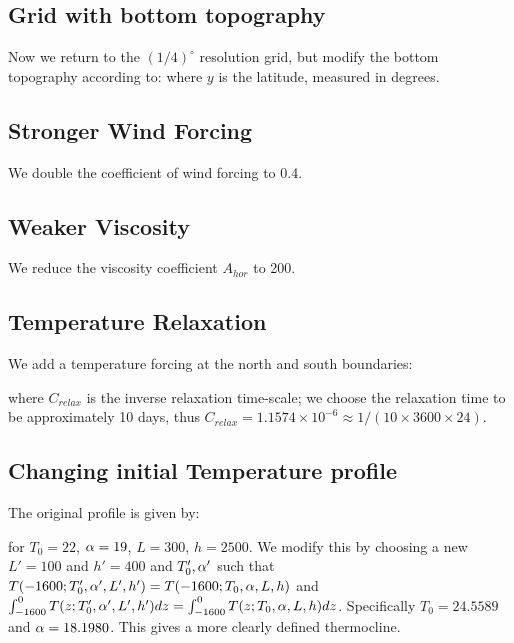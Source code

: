 \documentclass[10pt]{article}
\begin{document}
\iffalse
\allplot{high}{res}{1}{1948}{12}{1956}{0}{10}{22}
\fi
\subsection{Grid with bottom topography}

Now we return to the $(1/4)^\circ$ resolution grid, but modify the bottom topography according to:
where $y$ is the latitude, measured in degrees. 

\iffalse
\allplot{bottom}{topog}{1}{1948}{12}{1956}{0}{10}{22}
\fi

\subsection{Stronger Wind Forcing}

We double the coefficient of wind forcing to 0.4.

\subsection{Weaker Viscosity}

We reduce the viscosity coefficient $A_{hor}$ to 200.

\subsection{Temperature Relaxation}

We add a temperature forcing at the north and south boundaries:


where $C_{relax}$ is the inverse relaxation time-scale; we choose the relaxation time to be approximately 10 days, thus $C_{relax} = 1.1574\times 10^{-6} \approx 1/(10\times 3600\times 24)$.  

\subsection{Changing initial Temperature profile}

The original profile is given by:

for $T_{0} = 22$, $\alpha = 19$, $L = 300$, $h = 2500$. We modify this by choosing a new $L' = 100$ and $h' = 400$ and $T_{0}',\alpha'$ such that $T(-1600; T_{0}',\alpha',L',h') = T(-1600; T_{0},\alpha,L,h)$ and $\int_{-1600}^{0}T(z;T_{0}',\alpha',L',h')dz = \int_{-1600}^{0}T(z;T_{0},\alpha,L,h)dz$. Specifically $T_{0} = 24.5589$ and $\alpha = 18.1980$. This gives a more clearly defined thermocline. 
\end{document}
